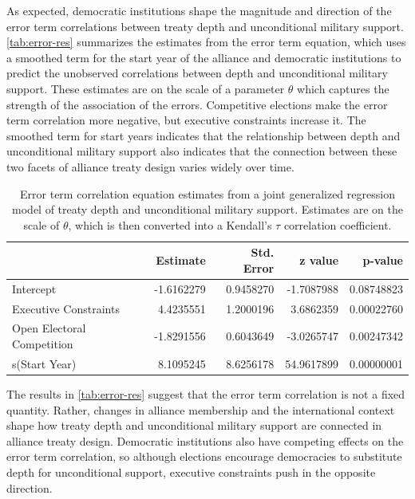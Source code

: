 \documentclass[12pt]{article}
\begin{document}
As expected, democratic institutions shape the magnitude and direction of the error term correlations between treaty depth and unconditional military support. 
\autoref{tab:error-res} summarizes the estimates from the error term equation, which uses a smoothed term for the start year of the alliance and democratic institutions to predict the unobserved correlations between depth and unconditional military support. 
These estimates are on the scale of a parameter $\theta$ which captures the strength of the association of the errors. 
Competitive elections make the error term correlation more negative, but executive constraints increase it. 
The smoothed term for start years indicates that the relationship between depth and unconditional military support also indicates that the connection between these two facets of alliance treaty design varies widely over time. 


\begin{table}[ht]
\centering
\begin{tabular}{lrrrr}
  \hline
 & Estimate & Std. Error & z value & p-value \\ 
  \hline
Intercept & -1.6162279 & 0.9458270 & -1.7087988 & 0.08748823 \\ 
  Executive Constraints & 4.4235551 & 1.2000196 & 3.6862359 & 0.00022760 \\ 
  Open Electoral Competition & -1.8291556 & 0.6043649 & -3.0265747 & 0.00247342 \\ 
  s(Start Year) & 8.1095245 & 8.6256178 & 54.9617899 & 0.00000001 \\ 
   \hline
\end{tabular}
\caption{Error term correlation equation estimates from a joint generalized regression model of treaty depth and unconditional military support. 
                    Estimates are on the scale of $\theta$, which is then converted into a Kendall's $\tau$ correlation coefficient. 
                    } 
\label{tab:error-res}
\end{table}


The results in \autoref{tab:error-res} suggest that the error term correlation is not a fixed quantity. 
Rather, changes in alliance membership and the international context shape how treaty depth and unconditional military support are connected in alliance treaty design. 
Democratic institutions also have competing effects on the error term correlation, so although elections encourage democracies to substitute depth for unconditional support, executive constraints push in the opposite direction. 
\end{document}
